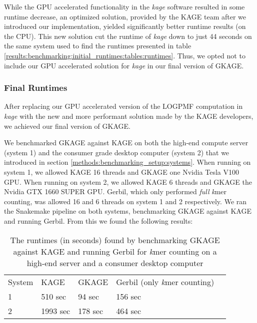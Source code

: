 While the GPU accelerated functionality in the \textit{kage} software resulted in some runtime decrease, an optimized solution, provided by the KAGE team after we introduced our implementation, yielded significantly better runtime results (on the CPU).
This new solution cut the runtime of \textit{kage} down to just 44 seconds on the same system used to find the runtimes presented in table \ref{results:benchmarking:initial_runtimes:tables:runtimes}.
Thus, we opted not to include our GPU accelerated solution for \textit{kage} in our final version of GKAGE.

\subsubsection{Final Runtimes} \label{results:benchmarking:final_runtimes}
After replacing our GPU accelerated version of the LOGPMF computation in \textit{kage} with the new and more performant solution made by the KAGE developers, we achieved our final version of GKAGE.

We benchmarked GKAGE against KAGE on both the high-end compute server (system 1) and the consumer grade desktop computer (system 2) that we introduced in section \ref{methods:benchmarking_setup:systems}.
When running on system 1, we allowed KAGE 16 threads and GKAGE one Nvidia Tesla V100 GPU.
When running on system 2, we allowed KAGE 6 threads and GKAGE the Nvidia GTX 1660 SUPER GPU.
Gerbil, which only performed \textit{full} \textit{k}mer counting, was allowed 16 and 6 threads on system 1 and 2 respectively.
We ran the Snakemake pipeline on both systems, benchmarking GKAGE against KAGE and running Gerbil.
From this we found the following results:

\begin{table}[H]
\begin{center}
\begin{tabular}{lllll}
  \multicolumn{1}{l|}{System} & \multicolumn{1}{l}{KAGE}     & \multicolumn{1}{l}{GKAGE} & \multicolumn{1}{l}{Gerbil (only \textit{k}mer counting)} & \\ \cline{1-4}
\multicolumn{1}{l|}{1}      & \multicolumn{1}{l}{510 sec}  & \multicolumn{1}{l}{94 sec} & \multicolumn{1}{l}{156 sec} & \\
\multicolumn{1}{l|}{2}      & \multicolumn{1}{l}{1993 sec} & \multicolumn{1}{l}{178 sec} & \multicolumn{1}{l}{464 sec} & \\
\end{tabular}
\end{center}
\caption{
  The runtimes (in seconds) found by benchmarking GKAGE against KAGE and running Gerbil for \textit{k}mer counting on a high-end server and a consumer desktop computer
}
\label{results:benchmarking:final_runtimes:tables:runtimes}
\end{table}

